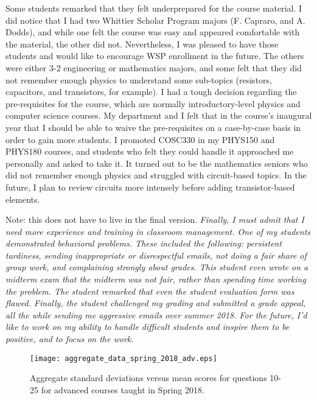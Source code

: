 \documentclass[../../main.tex]{subfiles}
\begin{document}
Some students remarked that they felt underprepared for the course material.  I did notice that I had two Whittier Scholar Program majors (F. Capraro, and A. Dodds), and while one felt the course was easy and appeared comfortable with the material, the other did not.  Nevertheless, I was pleased to have those students and would like to encourage WSP enrollment in the future.  The others were either 3-2 engineering or mathematics majors, and some felt that they did not remember enough physics to understand some sub-topics (resistors, capacitors, and transistors, for example).  I had a tough decision regarding the pre-requisites for the course, which are normally introductory-level physics and computer science courses.  My department and I felt that in the course's inaugural year that I should be able to waive the pre-requisites on a case-by-case basis in order to gain more students.  I promoted COSC330 in my PHYS150 and PHYS180 courses, and students who felt they could handle it approached me personally and asked to take it. It turned out to be the mathematics seniors who did not remember enough physics and struggled with circuit-based topics.  In the future, I plan to review circuits more intensely before adding transistor-based elements. \\ \hspace{0.1cm}

Note: this does not have to live in the final version. \textit{Finally, I must admit that I need more experience and training in classroom management.  One of my students demonstrated behavioral problems.  These included the following: persistent tardiness, sending inappropriate or disrespectful emails, not doing a fair share of group work, and complaining strongly about grades.  This student even wrote \textit{on a midterm exam} that the midterm was not fair, rather than spending time working the problem.  The student remarked that even the student evaluation form was flawed.  Finally, the student challenged my grading and submitted a grade appeal, all the while sending me aggressive emails over summer 2018.  For the future, I'd like to work on my ability to handle difficult students and inspire them to be positive, and to focus on the work.}

\begin{figure}
\centering
\texttt{[image: aggregate\_data\_spring\_2018\_adv.eps]}
\caption{\label{fig:ag_data2} Aggregate standard deviations versus mean scores for questions 10-25 for advanced courses taught in Spring 2018.}
\end{figure}
\end{document}
